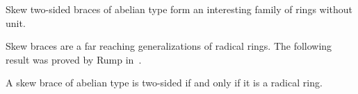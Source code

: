Skew two-sided braces of abelian type form an interesting family of rings without unit. 



Skew braces are a far reaching generalizations of radical rings. The following result was proved by Rump in~\cite{MR2278047}.

\begin{theorem}
\label{thm:radical}
    A skew brace of abelian type is two-sided if and only if it is a radical ring. 
\end{theorem}

